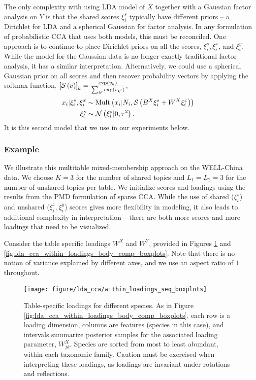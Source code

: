\documentclass[14pt]{extarticle}
\begin{document}
The only complexity with using LDA model of $X$ together with a Gaussian factor
analysis on $Y$ is that the shared scores $\xi_{i}^{s}$ typically have different
priors -- a Dirichlet for LDA and a spherical Gaussian for factor analysis. In
any formulation of probabilistic CCA that uses both models, this must be
reconciled. One approach is to continue to place Dirichlet priors on all the
scores, $\xi_{i}^s, \xi_{i}^x$, and $\xi_{i}^y$. While the model for the
Gaussian data is no longer exactly traditional factor analysis, it has a similar
interpretation. Alternatively, we could use a spherical Gaussian prior on all
scores and then recover probability vectors by applying the softmax function,
$\left[\mathcal{S}\left(v\right)\right]_{k} =
\frac{\operatorname{exp}\left(v_{k}\right)}{\sum_{k^{\prime}}\operatorname{exp}\left(v_{k^{\prime}}\right)}$,
\begin{align*}
  x_{i} \vert \xi_{i}^{s}, \xi_{i}^{x} &\sim \textnormal{Mult}\left(x_{i} \vert N_{i},
  \mathcal{S}\left(B^{X} \xi_{i}^{s} + W^{X} \xi_{i}^{x}\right)\right) \\
  \xi_{i}^{s} &\sim \mathcal{N}\left(\xi_i^s \vert 0, \tau^{2}\right).
\end{align*}
It is this second model that we use in our experiments below.

\subsubsection{Example}
\label{subsubsec:lda_cca_example}

We illustrate this multitable mixed-membership approach on the WELL-China data.
We choose $K = 3$ for the number of shared topics and $L_{1} = L_{2} = 3$ for
the number of unshared topics per table. We initialize scores and loadings using
the results from the PMD formulation of sparse CCA. While the use of shared
($\xi_{i}^{s}$) and unshared ($\xi_{i}^{x}, \xi_{i}^{y}$) scores gives more
flexibility in modeling, it also leads to additional complexity in
interpretation -- there are both more scores and more loadings that need to be
visualized.

Consider the table specific loadings $W^{X}$ and $W^{Y}$, provided in Figures
\ref{fig:lda_cca_within_loadings_seq_boxplots} and
\ref{fig:lda_cca_within_loadings_body_comp_boxplots}. Note that there is no
notion of variance explained by different axes, and we use an aspect ratio of
$1$ throughout.

\begin{figure}
  \centering
  \texttt{[image: figure/lda\_cca/within\_loadings\_seq\_boxplots]}
  \caption{Table-specific loadings for different species. As in Figure
    \ref{fig:lda_cca_within_loadings_body_comp_boxplots}, each row is a loading
    dimension, columns are features (species in this case), and intervals
    summarize posterior samples for the associated loading parameter,
    $W^{X}_{jk}$. Species are sorted from most to least abundant, within each
    taxonomic family. Caution must be exercised when interpreting these
    loadings, as loadings are invariant under rotations and
    reflections. \label{fig:lda_cca_within_loadings_seq_boxplots}}
\end{figure}
\end{document}
